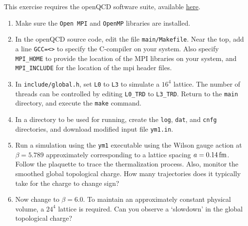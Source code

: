 This exercise requires the openQCD software suite, available \href{https://luscher.web.cern.ch/luscher/openQCD/openQCD-2.4.2.tar.gz}{here}. 

\begin{enumerate}
	\item Make sure the \texttt{Open MPI} and \texttt{OpenMP} libraries are installed.
	\item In the openQCD source code, edit the file \texttt{main/Makefile}.
		Near the top, add a line \texttt{GCC=<>} to specify the C-compiler on your 
		system. Also specify \texttt{MPI\_HOME} to provide the location of the MPI libraries on your system, and \texttt{MPI\_INCLUDE} for the location of the mpi header files.
	\item In \texttt{include/global.h}, set \texttt{L0} to \texttt{L3} to simulate a $16^4$ lattice. The number of threads can be controlled by editing \texttt{L0\_TRD} to \texttt{L3\_TRD}. Return to the \texttt{main} directory, and execute the \texttt{make} command.
	\item In a directory to be used for running, create the \texttt{log}, \texttt{dat}, and \texttt{cnfg} directories, and download modified input file 
		\texttt{ym1.in}. 
	\item Run a simulation using the \texttt{ym1} executable using the Wilson gauge action at $\beta=5.789$ approximately corresponding to a lattice spacing $a=0.14\,{\rm fm}$. Follow the plaquette to trace the thermalization process. Also, monitor the smoothed global topological charge. How many trajectories does it typically take for the charge to change sign? 
	\item  Now change to $\beta=6.0$. To maintain an approximately constant physical volume, a $24^4$ lattice is required. Can you observe a `slowdown' in the global topological charge?  
\end{enumerate}